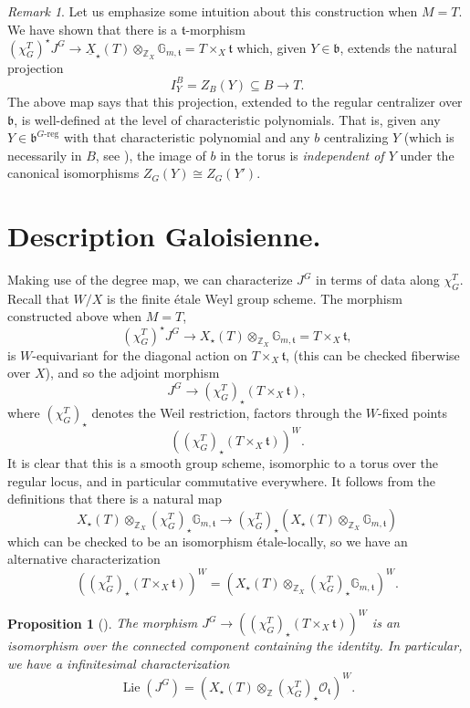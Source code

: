 \documentclass[openany]{amsbook}
\newtheorem{proposition}[theorem]{Proposition}
\theoremstyle{definition}
\theoremstyle{remark}
\newtheorem{remark}[theorem]{Remark}
\numberwithin{equation}{section}
\newcommand{\Z}{\mathbb{Z}}
\newcommand{\G}{\mathbb{G}}
\renewcommand{\O}{\mathcal{O}}
\newcommand{\ul}[1]{\underline{#1}}
\renewcommand{\-}{\operatorname{-}}
\newcommand{\on}[1]{\operatorname{#1}}
\newcommand{\ft}{\mathfrak{t}}
\newcommand{\fb}{\mathfrak{b}}
\newcommand{\Greg}{G\text{-reg}}
\begin{document}
\begin{remark}
Let us emphasize some intuition about this construction when $M = T$. We have shown that there is a $\ft$-morphism $(\chi_G^T)^\star J^G \to \ul{X}_\star(T) \otimes_{\Z_X} \G_{m, \ft} = T \times_X \ft$ which, given $Y \in \fb$, extends the natural projection 
$$
I_Y^B = Z_B(Y) \subseteq B \to T.
$$
The above map says that this projection, extended to the regular centralizer over $\fb$, is well-defined at the level of characteristic polynomials. That is, given any $Y \in \fb^{\Greg}$ with that characteristic polynomial and any $b$ centralizing $Y$ (which is necessarily in $B$, see \cite[Lemme 2.4.3]{ngofl}), the image of $b$ in the torus is \textit{independent of $Y$} under the canonical isomorphisms $Z_G(Y) \cong Z_G(Y')$.
\end{remark}



\section{Description Galoisienne.}\label{subsect.descr.galois}

Making use of the degree map, we can characterize $J^G$ in terms of data along $\chi^T_G$. Recall that $W/X$ is the finite \'etale Weyl group scheme. The morphism constructed above when $M = T$,
$$
    (\chi_G^T)^\star J^G \to X_\star(T) \otimes_{\Z_X} \G_{m, \ft} = T \times_X \ft,
$$
is $W$-equivariant for the diagonal action on $T \times_X \ft$, (this can be checked fiberwise over $X$), and so the adjoint morphism
$$
    J^G \to (\chi_G^T)_\star (T \times_X \ft),
$$ 
where $(\chi_G^T)_\star$ denotes the Weil restriction, factors through the $W$-fixed points
$$
    ((\chi_G^T)_\star (T \times_X \ft))^W.
$$
It is clear that this is a smooth group scheme, isomorphic to a torus over the regular locus, and in particular commutative everywhere. It follows from the definitions that there is a natural map 
$$
    X_\star(T) \otimes_{\Z_X} (\chi_G^T)_\star \G_{m, \ft}  \to (\chi_G^T)_\star (X_\star(T) \otimes_{\Z_X} \G_{m, \ft})
$$
which can be checked to be an isomorphism \'etale-locally, so we have an alternative characterization
$$
    ((\chi^T_G)_\star(T \times_X \ft))^W = (X_\star(T) \otimes_{\Z_X} (\chi_G^T)_\star \G_{m, \ft})^W.
$$

\begin{proposition}[{{\cite[Corollaire 2.4.8]{ngofl}}}]
    The morphism $J^G \to ((\chi^T_G)_\star(T \times_X \ft))^W$ is an isomorphism over the connected component containing the identity. In particular, we have a infinitesimal characterization
    $$
        \on{Lie}(J^G) = (X_\star(T) \otimes_{\Z} (\chi_G^T)_\star \O_{\ft})^W.
    $$
\end{proposition}
\end{document}
